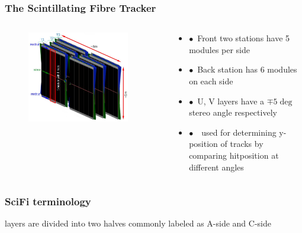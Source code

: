 \documentclass[aspectratio=1610, 12pt, xcolor=dvipsnames]{beamer}
\begin{document}
\begin{frame}\frametitle{The Scintillating Fibre Tracker}
  \begin{columns}
    \begin{column}[c]{0.48\textwidth}
      \begin{figure}
        \includegraphics[width=0.9\textwidth]{logos/scifi.png}
      \end{figure}
    \end{column}
    \begin{column}{0.48\textwidth}
      \begin{itemize}
        \item $\bullet$\, Front two stations have 5 modules per side
        \item $\bullet$\, Back station has 6 modules on each side
        \item $\bullet$\, U, V layers have a $\mp 5 \deg$ stereo angle respectively
        \item $\bullet$\, \to\, used for determining y-position of tracks by comparing hitposition at different angles
      \end{itemize}
    \end{column}
  \end{columns}
\end{frame}

\begin{frame}\frametitle{SciFi terminology}
layers are divided into two halves commonly labeled as A-side and C-side
  
\end{frame}
\end{document}
